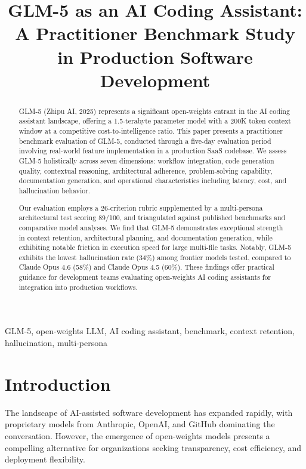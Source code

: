 \documentclass[conference]{IEEEtran}
\begin{document}
\title{GLM-5 as an AI Coding Assistant:\\A Practitioner Benchmark Study in Production Software Development}

\author{
}

\maketitle

\begin{abstract}
GLM-5 (Zhipu AI, 2025) represents a significant open-weights entrant in the AI coding assistant landscape, offering a 1.5-terabyte parameter model with a 200K token context window at a competitive cost-to-intelligence ratio. This paper presents a practitioner benchmark evaluation of GLM-5, conducted through a five-day evaluation period involving real-world feature implementation in a production SaaS codebase. We assess GLM-5 holistically across seven dimensions: workflow integration, code generation quality, contextual reasoning, architectural adherence, problem-solving capability, documentation generation, and operational characteristics including latency, cost, and hallucination behavior.

Our evaluation employs a 26-criterion rubric supplemented by a multi-persona architectural test scoring 89/100, and triangulated against published benchmarks and comparative model analyses. We find that GLM-5 demonstrates exceptional strength in context retention, architectural planning, and documentation generation, while exhibiting notable friction in execution speed for large multi-file tasks. Notably, GLM-5 exhibits the lowest hallucination rate (34\%) among frontier models tested, compared to Claude Opus 4.6 (58\%) and Claude Opus 4.5 (60\%). These findings offer practical guidance for development teams evaluating open-weights AI coding assistants for integration into production workflows.
\end{abstract}

\begin{IEEEkeywords}
GLM-5, open-weights LLM, AI coding assistant, benchmark, context retention, hallucination, multi-persona
\end{IEEEkeywords}

\section{Introduction}
The landscape of AI-assisted software development has expanded rapidly, with proprietary models from Anthropic, OpenAI, and GitHub dominating the conversation. However, the emergence of open-weights models presents a compelling alternative for organizations seeking transparency, cost efficiency, and deployment flexibility.
\end{document}
